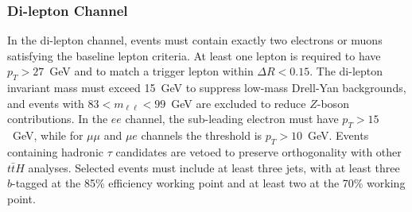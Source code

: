 \subsubsection{Di-lepton Channel}
In the di-lepton channel, events must contain exactly two electrons or muons satisfying the baseline lepton criteria. At least one lepton is required to have $p_{T} > 27$~GeV and to match a trigger lepton within $\Delta R < 0.15$. The di-lepton invariant mass must exceed 15~GeV to suppress low-mass Drell-Yan backgrounds, and events with $83 < m_{\ell\ell} < 99$~GeV are excluded to reduce $Z$-boson contributions. In the $ee$ channel, the sub-leading electron must have $p_{T} > 15$~GeV, while for $\mu\mu$ and $\mu e$ channels the threshold is $p_{T} > 10$~GeV. Events containing hadronic $\tau$ candidates are vetoed to preserve orthogonality with other $t\bar{t}H$ analyses. Selected events must include at least three jets, with at least three $b$-tagged at the 85\% efficiency working point and at least two at the 70\% working point.  
